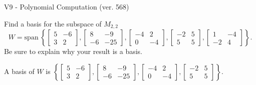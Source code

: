 \begin{exercise}
  \begin{exerciseTitle}V9 - Polynomial Computation (ver. 568)\end{exerciseTitle}
  \begin{exerciseStatement}
    Find a basis for the subspace of \(M_{2,2}\) 
\[W=\mathrm{span}\ \left\{\left[\begin{array}{cc}
5 & -6 \\
3 & 2
\end{array}\right] , \left[\begin{array}{cc}
8 & -9 \\
-6 & -25
\end{array}\right] , \left[\begin{array}{cc}
-4 & 2 \\
0 & -4
\end{array}\right] , \left[\begin{array}{cc}
-2 & 5 \\
5 & 5
\end{array}\right] , \left[\begin{array}{cc}
1 & -4 \\
-2 & 4
\end{array}\right]\right\}.\]
 Be sure to explain why your result is a basis.


  \end{exerciseStatement}
  \begin{exerciseAnswer}
   A basis of \(W\) is  \(\left\{\left[\begin{array}{cc}
5 & -6 \\
3 & 2
\end{array}\right] , \left[\begin{array}{cc}
8 & -9 \\
-6 & -25
\end{array}\right] , \left[\begin{array}{cc}
-4 & 2 \\
0 & -4
\end{array}\right] , \left[\begin{array}{cc}
-2 & 5 \\
5 & 5
\end{array}\right]\right\}\).
  


  \end{exerciseAnswer}
\end{exercise}